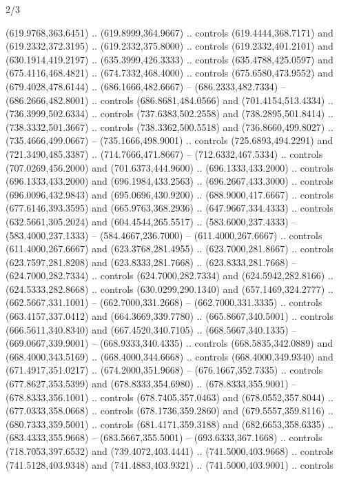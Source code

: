 \begin{flagdescription}{2/3}
\begin{scope}[xshift=0.5\flaglength,yshift=0.5\flagwidth,scale=\flagwidth/525.28]
\begin{scope}[y=0.1mm, x=0.1mm, yscale=-1,shift={(-381.5,-404)}]
\begin{scope}[shift={(5.25001,4.53053)},miter limit=4.00,line width=0.800\lw]
  (619.9768,363.6451) .. (619.8999,364.9667) .. controls (619.4444,368.7171) and
  (619.2332,372.3195) .. (619.2332,375.8000) .. controls (619.2332,401.2101) and
  (630.1914,419.2197) .. (635.3999,426.3333) .. controls (635.4788,425.0597) and
  (675.4116,468.4821) .. (674.7332,468.4000) .. controls (675.6580,473.9552) and
  (679.4028,478.6144) .. (686.1666,482.6667) -- (686.2333,482.7334) --
  (686.2666,482.8001) .. controls (686.8681,484.0566) and (701.4154,513.4334) ..
  (736.3999,502.6334) .. controls (737.6383,502.2558) and (738.2895,501.8414) ..
  (738.3332,501.3667) .. controls (738.3362,500.5518) and (736.8660,499.8027) ..
  (735.4666,499.0667) -- (735.1666,498.9001) .. controls (725.6893,494.2291) and
  (721.3490,485.3387) .. (714.7666,471.8667) -- (712.6332,467.5334) .. controls
  (707.0269,456.2000) and (701.6373,444.9600) .. (696.1333,433.2000) .. controls
  (696.1333,433.2000) and (696.1984,433.2563) .. (696.2667,433.3000) .. controls
  (696.0096,432.9843) and (695.0696,430.9200) .. (688.9000,417.6667) .. controls
  (677.6146,393.3595) and (665.9763,368.2936) .. (647.9667,334.4333) .. controls
  (632.5661,305.2024) and (604.4544,265.5517) .. (583.6000,237.4333) --
  (583.4000,237.1333) -- (584.4667,236.7000) -- (611.4000,267.6667) .. controls
  (611.4000,267.6667) and (623.3768,281.4955) .. (623.7000,281.8667) .. controls
  (623.7597,281.8208) and (623.8333,281.7668) .. (623.8333,281.7668) --
  (624.7000,282.7334) .. controls (624.7000,282.7334) and (624.5942,282.8166) ..
  (624.5333,282.8668) .. controls (630.0299,290.1340) and (657.1469,324.2777) ..
  (662.5667,331.1001) -- (662.7000,331.2668) -- (662.7000,331.3335) .. controls
  (663.4157,337.0412) and (664.3669,339.7780) .. (665.8667,340.5001) .. controls
  (666.5611,340.8340) and (667.4520,340.7105) .. (668.5667,340.1335) --
  (669.0667,339.9001) -- (668.9333,340.4335) .. controls (668.5835,342.0889) and
  (668.4000,343.5169) .. (668.4000,344.6668) .. controls (668.4000,349.9340) and
  (671.4917,351.0217) .. (674.2000,351.9668) -- (676.1667,352.7335) .. controls
  (677.8627,353.5399) and (678.8333,354.6980) .. (678.8333,355.9001) --
  (678.8333,356.1001) .. controls (678.7405,357.0463) and (678.0552,357.8044) ..
  (677.0333,358.0668) .. controls (678.1736,359.2860) and (679.5557,359.8116) ..
  (680.7333,359.5001) .. controls (681.4171,359.3188) and (682.6653,358.6335) ..
  (683.4333,355.9668) -- (683.5667,355.5001) -- (693.6333,367.1668) .. controls
  (718.7053,397.6532) and (739.4072,403.4441) .. (741.5000,403.9668) .. controls
  (741.5128,403.9348) and (741.4883,403.9321) .. (741.5000,403.9001) .. controls

\end{scope}
\end{scope}
\end{scope}
\end{flagdescription}
